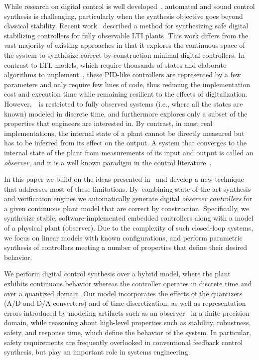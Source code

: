 \documentclass[a4paper,UKenglish]{lipics-v2018}
\begin{document}
While research on digital control is well
developed~\cite{astrom1997computer}, automated and sound control
synthesis is challenging, particularly when the synthesis objective
goes beyond classical stability.  Recent
work~\cite{DBLP:conf/cav/AbateBCCDKKP17} described a method for synthesizing
safe digital stabilizing controllers for fully observable LTI plants.
This work differs from the vast majority of existing approaches in
that it explores the continuous space of the system to synthesize
correct-by-construction minimal digital controllers.  In contrast to
LTL models, which require thousands of states and elaborate algorithms
to implement~\cite{reissig2017feedback}, these PID-like controllers
are represented by a few parameters and only require few lines of
code, thus reducing the implementation cost and execution time while
remaining resilient to the effects of digitalization.
However,~\cite{DBLP:conf/cav/AbateBCCDKKP17}~is restricted to fully observed
systems (i.e., where all the states are known) modeled in discrete
time, and furthermore explores only a subset of the properties that
engineers are interested in.  By contrast, in most real
implementations, the internal state of a plant cannot be directly
measured but has to be inferred from its effect on the output. A
system that converges to the internal state of the plant from
measurements of its input and output is called an \emph{observer}, and
it is a well known paradigm in the control
literature~\cite{astrom1997computer}.

In this paper we build on the ideas presented in~\cite{DBLP:conf/cav/AbateBCCDKKP17}
and develop a new technique that addresses most of these limitations. 
By~combining state-of-the-art synthesis and verification engines we
automatically generate digital \emph{observer controllers} for a given
continuous plant model that are correct by construction.
%
%
Specifically, we synthesize stable, software-implemented embedded
controllers along with a model of a physical plant (observer).  Due to the
complexity of such closed-loop systems, we focus on linear models with known
configurations, and perform parametric synthesis of controllers meeting a
number of properties that define their desired behavior.

We perform digital control synthesis over a hybrid model, where the plant
exhibits continuous behavior whereas the controller operates in discrete
time and over a quantized domain.  Our model incorporates the effects of the
quantizers (A/D and D/A converters) and of time discretization, as well as
representation errors introduced by modeling artifacts such as an
observer~\cite{astrom1997computer} in a finite-precision domain, while
reasoning about high-level properties such as stability, robustness, safety,
and response time, which define the behavior of the system.  In particular,
safety requirements are frequently overlooked in conventional feedback
control synthesis, but play an important role in systems engineering.
\end{document}
